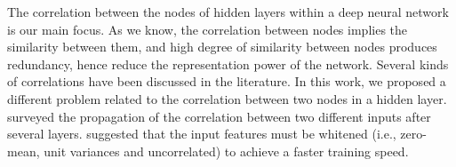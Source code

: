 The correlation between the nodes of hidden layers within a deep neural network is our main focus.
As we know, the correlation between nodes implies the similarity between them, and high degree of
similarity between nodes produces redundancy, hence reduce the representation power of the network.
Several kinds of correlations have been discussed in the literature.
In this work, we proposed a different problem related to the correlation between two nodes in a hidden layer.
\cite{mft:info} surveyed the propagation of the correlation between two different inputs after several layers.
\cite{whiten1, whiten2} suggested that the input features must be whitened (i.e., zero-mean, unit variances and uncorrelated) to achieve a faster training speed.



